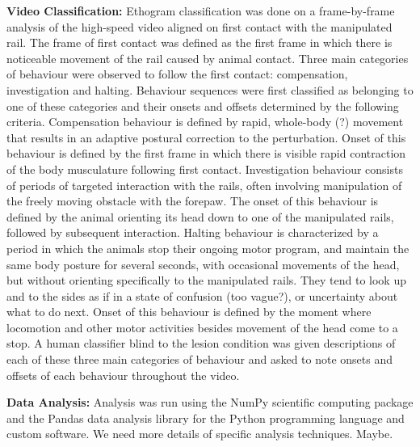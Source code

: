 \textbf{Video Classification:} Ethogram classification was done on a frame-by-frame analysis of the high-speed video aligned on first contact with the manipulated rail. The frame of first contact was defined as the first frame in which there is noticeable movement of the rail caused by animal contact. Three main categories of behaviour were observed to follow the first contact: compensation, investigation and halting. Behaviour sequences were first classified as belonging to one of these categories and their onsets and offsets determined by the following criteria. Compensation behaviour is defined by rapid, whole-body (?) movement that results in an adaptive postural correction to the perturbation. Onset of this behaviour is defined by the first frame in which there is visible rapid contraction of the body musculature following first contact. Investigation behaviour consists of periods of targeted interaction with the rails, often involving manipulation of the freely moving obstacle with the forepaw. The onset of this behaviour is defined by the animal orienting its head down to one of the manipulated rails, followed by subsequent interaction. Halting behaviour is characterized by a period in which the animals stop their ongoing motor program, and maintain the same body posture for several seconds, with occasional movements of the head, but without orienting specifically to the manipulated rails. They tend to look up and to the sides as if in a state of confusion (too vague?), or uncertainty about what to do next. Onset of this behaviour is defined by the moment where locomotion and other motor activities besides movement of the head come to a stop. A human classifier blind to the lesion condition was given descriptions of each of these three main categories of behaviour and asked to note onsets and offsets of each behaviour throughout the video.

\textbf{Data Analysis:} Analysis was run using the NumPy scientific computing package \cite{Walt2011} and the Pandas data analysis library \cite{McKinney2010} for the Python programming language and custom software. We need more details of specific analysis techniques. Maybe.
